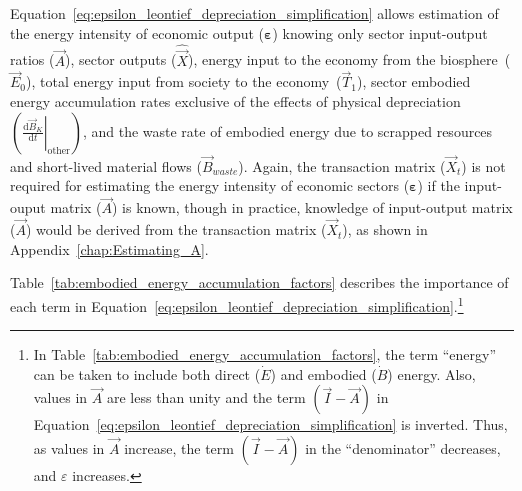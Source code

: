 \noindent{}Equation~\ref{eq:epsilon_leontief_depreciation_simplification} 
allows estimation of the energy intensity 
of economic output ($\bm{\varepsilon}$) 
knowing only 
sector input-output ratios ($\vec{A}$), 
sector outputs ($\hat{\vec{X}}$), 
energy input to the economy from the biosphere~($\vec{E}_{0}$), 
total energy input from society to the economy~($\vec{T}_{1}$),
sector embodied energy accumulation rates
exclusive of the effects of physical
depreciation~$\left( \left. \frac{\mathrm{d}\vec{B}_{K}}{\mathrm{d}t} \right|_{\mathrm{other}} \right)$,
and the waste rate of embodied energy due to scrapped resources and short-lived material flows
($\vec{B}_{waste}$).
Again, the transaction matrix ($\vec{X}_{t}$) 
is not required for estimating the energy intensity 
of economic sectors ($\bm{\varepsilon}$)
if the input-ouput matrix ($\vec{A}$) is known, 
though in practice, 
knowledge of input-output matrix ($\vec{A}$) 
would be derived from the transaction matrix ($\vec{X}_{t}$),
as shown in Appendix~\ref{chap:Estimating_A}.

Table~\ref{tab:embodied_energy_accumulation_factors} 
describes the importance of each term in 
Equation~\ref{eq:epsilon_leontief_depreciation_simplification}.\footnote{In
Table~\ref{tab:embodied_energy_accumulation_factors}, the term ``energy'' can be 
taken to include both direct ($\dot{E}$) and embodied ($\dot{B}$) energy.
Also, values in $\vec{A}$ are less than unity 
and the term $(\vec{I} - \vec{A})$ 
in Equation~\ref{eq:epsilon_leontief_depreciation_simplification} 
is inverted. 
Thus, as values in $\vec{A}$ increase, 
the term $(\vec{I} - \vec{A})$ in the ``denominator'' decreases, 
and $\varepsilon$ increases.} 

